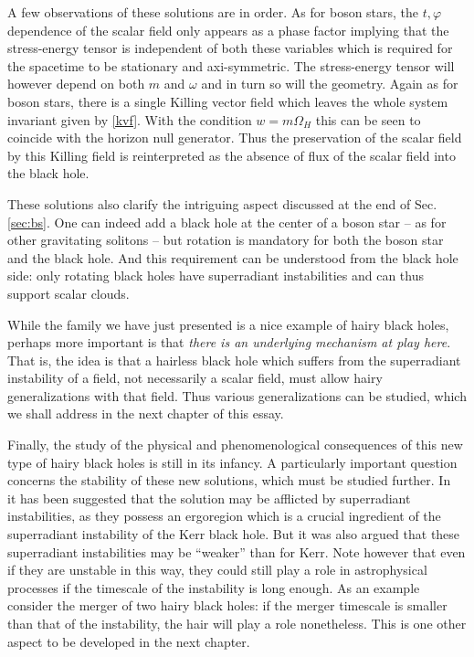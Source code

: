 A few observations of these solutions are in order.
As for boson stars, the $t,\varphi$ dependence of the scalar field only appears as a phase factor implying that the stress-energy tensor is independent of both these variables which is required for the spacetime to be stationary and axi-symmetric.
The stress-energy tensor will however depend on both $m$ and $\omega$ and in turn so will the geometry.
Again as for boson stars, there is a single Killing vector field which leaves the whole system invariant given by \eqref{kvf}.
With the condition $w=m\Omega_H$ this can be seen to coincide with the horizon null generator.
Thus the preservation of the scalar field by this Killing field is reinterpreted as the absence of flux of the scalar field into the black hole.

These solutions also clarify the intriguing aspect discussed at the end of Sec. \ref{sec:bs}.
One can indeed add a black hole at the center of a boson star -- as for other gravitating solitons -- but rotation is mandatory for both the boson star and the black hole.
And this requirement can be understood from the black hole side: only rotating black holes have superradiant instabilities and can thus support scalar clouds. 

While the family we have just presented is a nice example of hairy black holes, perhaps more important is that \textit{there is an underlying mechanism at play here}.
That is, the idea is that a hairless black hole which suffers from the superradiant instability of a field, not necessarily a scalar field, must allow hairy generalizations with that field.
Thus various generalizations can be studied, which we shall address in the next chapter of this essay.

Finally, the study of the physical and phenomenological consequences of this new type of hairy black holes is still in its infancy.
A particularly important question concerns the stability of these new solutions, which must be studied further.
In~\cite{Herdeiro:2014jaa} it has been suggested that the solution may be afflicted by superradiant instabilities, as they possess an ergoregion which is a crucial ingredient of the superradiant instability of the Kerr black hole.
But it was also argued that these superradiant instabilities may be ``weaker''  than for Kerr.
Note however that even if they are unstable in this way, they could still play a role in astrophysical processes if the timescale of the instability is long enough.
As an example consider the merger of two hairy black holes: if the merger timescale is smaller than that of the instability, the hair will play a role nonetheless.
This is one other aspect to be developed in the next chapter.
